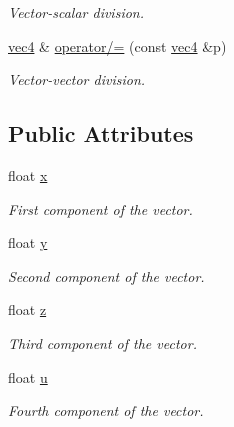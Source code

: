 \begin{DoxyCompactItemize}
\begin{DoxyCompactList}\small\item\em Vector-\/scalar division. \end{DoxyCompactList}\item 
\mbox{\label{structphysim_1_1math_1_1vec4_a7bfe7b41bd595cd41ea90ec0722e6644}} 
\hyperlink{structphysim_1_1math_1_1vec4}{vec4} \& \hyperlink{structphysim_1_1math_1_1vec4_a7bfe7b41bd595cd41ea90ec0722e6644}{operator/=} (const \hyperlink{structphysim_1_1math_1_1vec4}{vec4} \&p)
\begin{DoxyCompactList}\small\item\em Vector-\/vector division. \end{DoxyCompactList}\end{DoxyCompactItemize}
\subsection*{Public Attributes}
\begin{DoxyCompactItemize}
\item 
\mbox{\label{structphysim_1_1math_1_1vec4_a21bfa48cfaaf92c12e6af075ee661a3b}} 
float \hyperlink{structphysim_1_1math_1_1vec4_a21bfa48cfaaf92c12e6af075ee661a3b}{x}
\begin{DoxyCompactList}\small\item\em First component of the vector. \end{DoxyCompactList}\item 
\mbox{\label{structphysim_1_1math_1_1vec4_a718bf02c9b812d991467e1299de4b3d8}} 
float \hyperlink{structphysim_1_1math_1_1vec4_a718bf02c9b812d991467e1299de4b3d8}{y}
\begin{DoxyCompactList}\small\item\em Second component of the vector. \end{DoxyCompactList}\item 
\mbox{\label{structphysim_1_1math_1_1vec4_a46412c320c10c30f63dc4e54652f93f7}} 
float \hyperlink{structphysim_1_1math_1_1vec4_a46412c320c10c30f63dc4e54652f93f7}{z}
\begin{DoxyCompactList}\small\item\em Third component of the vector. \end{DoxyCompactList}\item 
\mbox{\label{structphysim_1_1math_1_1vec4_a04d868010d1b53431dbc96442d204685}} 
float \hyperlink{structphysim_1_1math_1_1vec4_a04d868010d1b53431dbc96442d204685}{u}
\begin{DoxyCompactList}\small\item\em Fourth component of the vector. \end{DoxyCompactList}\end{DoxyCompactItemize}


